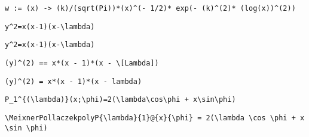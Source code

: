 \newsavebox\CQMA
\begin{lrbox}{\CQMA}
 \begin{minipage}[t]{0.82\textwidth}
  \lstinline[language={[latex]TeX},mathescape,breaklines=true]"w := (x) -> (k)/(sqrt(Pi))*(x)^(- 1/2)* exp(- (k)^(2)* (log(x))^(2))"
 \end{minipage}
\end{lrbox}
\newsavebox\CRT
\begin{lrbox}{\CRT}
 \begin{minipage}[t]{0.82\textwidth}
  \lstinline[language={[latex]TeX},mathescape,breaklines=true]"y^2=x(x-1)(x-\lambda)"
 \end{minipage}
\end{lrbox}
\newsavebox\CRST
\begin{lrbox}{\CRST}
 \begin{minipage}[t]{0.82\textwidth}
  \lstinline[language={[latex]TeX},mathescape,breaklines=true]"y^2=x(x-1)(x-\lambda)"
 \end{minipage}
\end{lrbox}
\newsavebox\CRMM
\begin{lrbox}{\CRMM}
 \begin{minipage}[t]{0.82\textwidth}
  \lstinline[language={[latex]TeX},mathescape,breaklines=true]"(y)^(2) == x*(x - 1)*(x - \[Lambda])"
 \end{minipage}
\end{lrbox}
\newsavebox\CRMA
\begin{lrbox}{\CRMA}
 \begin{minipage}[t]{0.82\textwidth}
  \lstinline[language={[latex]TeX},mathescape,breaklines=true]"(y)^(2) = x*(x - 1)*(x - lambda)"
 \end{minipage}
\end{lrbox}
\newsavebox\CST
\begin{lrbox}{\CST}
 \begin{minipage}[t]{0.82\textwidth}
  \lstinline[language={[latex]TeX},mathescape,breaklines=true]"P_1^{(\lambda)}(x;\phi)=2(\lambda\cos\phi + x\sin\phi)"
 \end{minipage}
\end{lrbox}
\newsavebox\CSST
\begin{lrbox}{\CSST}
 \begin{minipage}[t]{0.82\textwidth}
  \lstinline[language={[latex]TeX},mathescape,breaklines=true]"\MeixnerPollaczekpolyP{\lambda}{1}@{x}{\phi} = 2(\lambda \cos \phi + x \sin \phi)"
 \end{minipage}
\end{lrbox}
